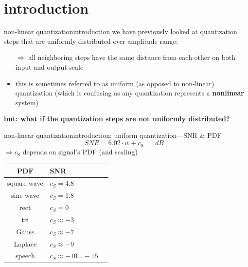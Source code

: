 


\subtitle{Part 12: Non-linear Quantization}


	

\section[intro]{introduction}

\begin{frame}{non-linear quantization}{introduction}
    we have previously looked at quantization steps that are uniformly distributed over amplitude range:
    \begin{itemize}
        \item[$\Rightarrow$]   all neighboring steps have the same distance from each other on both input and output scale
        \bigskip
        \item<2-> this is sometimes referred to as uniform (as opposed to non-linear) quantization (which is confusing as any quantization represents a \textbf{nonlinear} system)
    \end{itemize}
    \bigskip
    \textbf{but: what if the quantization steps are not uniformly distributed?}
\end{frame}	

\begin{frame}{non-linear quantization}{introduction: uniform quantization---SNR \& PDF}
		\begin{equation*}
			SNR = 6.02\cdot w + c_{\mathrm{S}}\quad [dB]
		\end{equation*}
		\pause
        \bigskip
		$\Rightarrow c_{\mathrm{S}}$ depends on signal's PDF (and scaling)
		\begin{table}
			\centering
			\begin{footnotesize}
				\begin{tabular}{clc}
				\hline
				\textbf{PDF} & \textbf{SNR}\\
				\hline
				square wave & $c_S =  4.8$\\
				sine wave & $c_S =  1.8$\\
				rect & $c_S =  0$\\
				tri & $c_S \approx  -3$\\
				Gauss & $c_S \approx  -7$\\
				Laplace & $c_S \approx  -9$\\
				speech & $c_S \approx  -10\ldots -15$\\
				\hline
				\end{tabular}
			\end{footnotesize}
		\end{table}
	\end{frame}	
    
